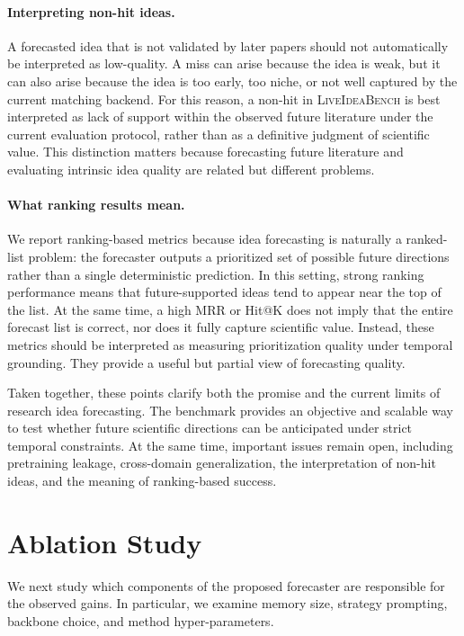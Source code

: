 \documentclass{article} %
\begin{document}
\paragraph{Interpreting non-hit ideas.}
A forecasted idea that is not validated by later papers should not automatically be interpreted as low-quality. A miss can arise because the idea is weak, but it can also arise because the idea is too early, too niche, or not well captured by the current matching backend. For this reason, a non-hit in \textsc{LiveIdeaBench} is best interpreted as lack of support within the observed future literature under the current evaluation protocol, rather than as a definitive judgment of scientific value. This distinction matters because forecasting future literature and evaluating intrinsic idea quality are related but different problems.

\paragraph{What ranking results mean.}
We report ranking-based metrics because idea forecasting is naturally a ranked-list problem: the forecaster outputs a prioritized set of possible future directions rather than a single deterministic prediction. In this setting, strong ranking performance means that future-supported ideas tend to appear near the top of the list. At the same time, a high MRR or Hit@K does not imply that the entire forecast list is correct, nor does it fully capture scientific value. Instead, these metrics should be interpreted as measuring prioritization quality under temporal grounding. They provide a useful but partial view of forecasting quality.

Taken together, these points clarify both the promise and the current limits of research idea forecasting. The benchmark provides an objective and scalable way to test whether future scientific directions can be anticipated under strict temporal constraints. At the same time, important issues remain open, including pretraining leakage, cross-domain generalization, the interpretation of non-hit ideas, and the meaning of ranking-based success.
\section{Ablation Study}
We next study which components of the proposed forecaster are responsible for the observed gains. In particular, we examine memory size, strategy prompting, backbone choice, and method hyper-parameters.
\end{document}
